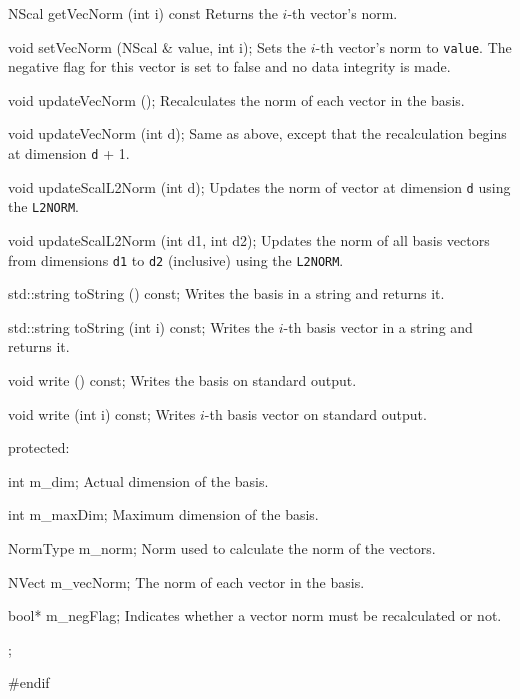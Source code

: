 {{   NScal getVecNorm (int i) const  \endhide
\endcode
\tabb
Returns the $i$-th vector's norm.
\endtabb
\code

   void setVecNorm (NScal & value, int i);
\endcode
\tabb
Sets the $i$-th vector's norm to \texttt{value}. The negative flag for this
vector is set to false and no data integrity is made.
\endtabb
\code

   void updateVecNorm (); 
\endcode
\tabb
Recalculates the norm of each vector in the basis.
\endtabb
\code

   void updateVecNorm (int d); 
\endcode
\tabb
Same as above, except that the recalculation begins at dimension \texttt{d} + 1.
\endtabb
\code

   void updateScalL2Norm (int d); 
\endcode
\tabb
Updates the norm of vector at dimension \texttt{d} using the \texttt{L2NORM}.
\endtabb
\code

   void updateScalL2Norm (int d1, int d2); 
\endcode
\tabb
Updates the norm of all basis vectors from dimensions \texttt{d1} to
\texttt{d2} (inclusive) using the \texttt{L2NORM}.
\endtabb
\code

   std::string toString () const;
\endcode
\tabb
Writes the basis in a string and returns it.
\endtabb
\code

   std::string toString (int i) const;
\endcode
\tabb
Writes the $i$-th basis vector in a string and returns it.
\endtabb
\code
   
   void write () const;
\endcode
\tabb
Writes the basis on standard output.
\endtabb
\code
 
   void write (int i) const;
\endcode
\tabb
Writes $i$-th basis vector on standard output.
\endtabb
\code


protected:

   int m_dim;
\endcode
\tabb
Actual dimension of the basis.
\endtabb
\code

   int m_maxDim;
\endcode
\tabb
Maximum dimension of the basis.
\endtabb
\code

   NormType m_norm;
\endcode
\tabb
Norm used to calculate the norm of the vectors.
\endtabb
\code

   NVect m_vecNorm;
\endcode
\tabb
The norm of each vector in the basis.
\endtabb
\code

   bool* m_negFlag;     
\endcode
\tabb
Indicates whether a vector norm must be recalculated or not.
\endtabb
\code
};

}
\hide
#endif
\endhide
\endcode
